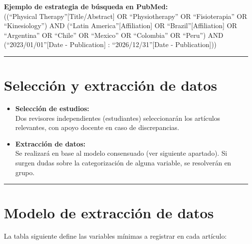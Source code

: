 \documentclass[
  letterpaper,
]{book}
\providecommand{\tightlist}{%
  \setlength{\itemsep}{0pt}\setlength{\parskip}{0pt}}\usepackage{longtable,booktabs,array}
\begin{document}
\textbf{Ejemplo de estrategia de búsqueda en PubMed:}\\
((``Physical Therapy''{[}Title/Abstract{]} OR ``Physiotherapy'' OR
``Fisioterapia'' OR ``Kinesiology'') AND (``Latin
America''{[}Affiliation{]} OR ``Brazil''{[}Affiliation{]} OR
``Argentina'' OR ``Chile'' OR ``Mexico'' OR ``Colombia'' OR ``Peru'')
AND (``2023/01/01''{[}Date - Publication{]} : ``2026/12/31''{[}Date -
Publication{]}))

\begin{center}\rule{0.5\linewidth}{0.5pt}\end{center}

\section{Selección y extracción de
datos}\label{selecciuxf3n-y-extracciuxf3n-de-datos}

\begin{itemize}
\tightlist
\item
  \textbf{Selección de estudios:}\\
  Dos revisores independientes (estudiantes) seleccionarán los artículos
  relevantes, con apoyo docente en caso de discrepancias.
\item
  \textbf{Extracción de datos:}\\
  Se realizará en base al modelo consensuado (ver siguiente apartado).
  Si surgen dudas sobre la categorización de alguna variable, se
  resolverán en grupo.
\end{itemize}

\begin{center}\rule{0.5\linewidth}{0.5pt}\end{center}

\section{Modelo de extracción de
datos}\label{modelo-de-extracciuxf3n-de-datos}

La tabla siguiente define las variables mínimas a registrar en cada
artículo:
\end{document}
